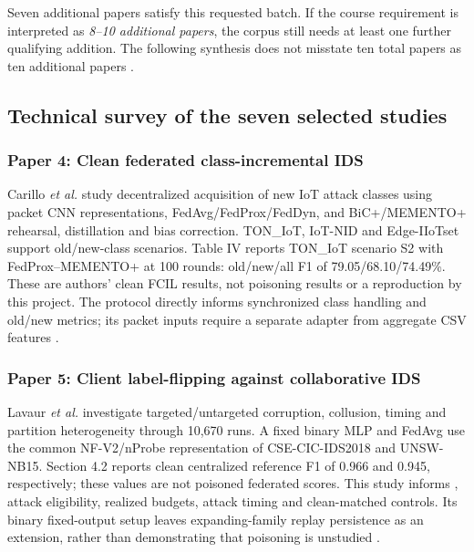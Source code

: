 \documentclass[10pt,a4paper]{article}
\begin{document}
Seven additional papers satisfy this requested batch. If the course requirement is interpreted as \emph{8--10 additional papers}, the corpus still needs at least one further qualifying addition. The following synthesis does not misstate ten total papers as ten additional papers \cite{phase1,repo}.

\subsection{Technical survey of the seven selected studies}
\subsubsection{Paper 4: Clean federated class-incremental IDS}
Carillo \emph{et al.} study decentralized acquisition of new IoT attack classes using packet CNN representations, FedAvg/FedProx/FedDyn, and BiC+/MEMENTO+ rehearsal, distillation and bias correction. TON\_IoT, IoT-NID and Edge-IIoTset support old/new-class scenarios. Table IV reports TON\_IoT scenario S2 with FedProx--MEMENTO+ at 100 rounds: old/new/all F1 of 79.05/68.10/74.49\%. These are authors' clean FCIL results, not poisoning results or a reproduction by this project. The protocol directly informs synchronized class handling and old/new metrics; its packet inputs require a separate adapter from aggregate CSV features \cite{carillo}.

\subsubsection{Paper 5: Client label-flipping against collaborative IDS}
Lavaur \emph{et al.} investigate targeted/untargeted corruption, collusion, timing and partition heterogeneity through 10,670 runs. A fixed binary MLP and FedAvg use the common NF-V2/nProbe representation of CSE-CIC-IDS2018 and UNSW-NB15. Section 4.2 reports clean centralized reference F1 of 0.966 and 0.945, respectively; these values are not poisoned federated scores. This study informs , attack eligibility, realized budgets, attack timing and clean-matched controls. Its binary fixed-output setup leaves expanding-family replay persistence as an extension, rather than demonstrating that poisoning is unstudied \cite{lavaur}.
\end{document}
